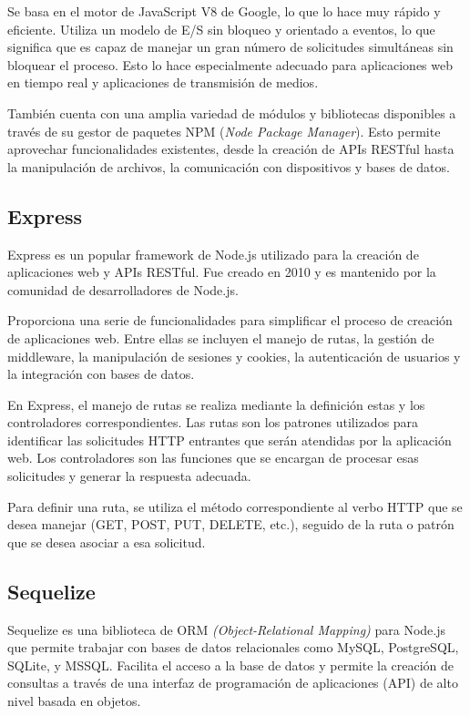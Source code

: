 Se basa en el motor de JavaScript V8 de Google, lo que lo hace muy rápido y eficiente. Utiliza un modelo de E/S sin bloqueo y orientado a eventos, lo que significa que es capaz de manejar un gran número de solicitudes simultáneas sin bloquear el proceso. Esto lo hace especialmente adecuado para aplicaciones web en tiempo real y aplicaciones de transmisión de medios.

También cuenta con una amplia variedad de módulos y bibliotecas disponibles a través de su gestor de paquetes NPM (\textit{Node Package Manager}). Esto permite aprovechar funcionalidades existentes, desde la creación de APIs RESTful hasta la manipulación de archivos, la comunicación con dispositivos y bases de datos.

\subsection{Express}
\label{subsec:express}

Express \cite{WEBSITE:express} es un popular framework de Node.js utilizado para la creación de aplicaciones web y APIs RESTful. Fue creado en 2010 y es mantenido por la comunidad de desarrolladores de Node.js.

Proporciona una serie de funcionalidades para simplificar el proceso de creación de aplicaciones web. Entre ellas se incluyen el manejo de rutas, la gestión de middleware, la manipulación de sesiones y cookies, la autenticación de usuarios y la integración con bases de datos.

En Express, el manejo de rutas se realiza mediante la definición estas y los controladores correspondientes. Las rutas son los patrones utilizados para identificar las solicitudes HTTP entrantes que serán atendidas por la aplicación web. Los controladores son las funciones que se encargan de procesar esas solicitudes y generar la respuesta adecuada.

Para definir una ruta, se utiliza el método correspondiente al verbo HTTP que se desea manejar (GET, POST, PUT, DELETE, etc.), seguido de la ruta o patrón que se desea asociar a esa solicitud. 

\subsection{Sequelize}
\label{subsec:sequelize}

Sequelize \cite{WEBSITE:sequelize} es una biblioteca de ORM \textit{(Object-Relational Mapping)} para Node.js que permite trabajar con bases de datos relacionales como MySQL, PostgreSQL, SQLite, y MSSQL. Facilita el acceso a la base de datos y permite la creación de consultas a través de una interfaz de programación de aplicaciones (API) de alto nivel basada en objetos.

